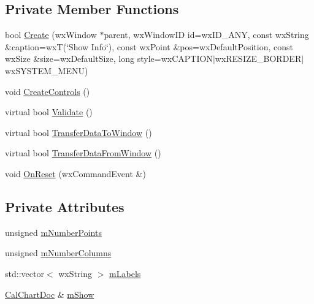 \subsection*{Private Member Functions}
\begin{DoxyCompactItemize}
\item 
bool \hyperlink{a00138_ade3ccb3f32f49eadcb1186a92d1ad6ba}{Create} (wx\-Window $\ast$parent, wx\-Window\-I\-D id=wx\-I\-D\-\_\-\-A\-N\-Y, const wx\-String \&caption=wx\-T(\char`\"{}Show Info\char`\"{}), const wx\-Point \&pos=wx\-Default\-Position, const wx\-Size \&size=wx\-Default\-Size, long style=wx\-C\-A\-P\-T\-I\-O\-N$\vert$wx\-R\-E\-S\-I\-Z\-E\-\_\-\-B\-O\-R\-D\-E\-R$\vert$wx\-S\-Y\-S\-T\-E\-M\-\_\-\-M\-E\-N\-U)
\item 
void \hyperlink{a00138_a1230a2236bf46eea891a46fca6589f6a}{Create\-Controls} ()
\item 
virtual bool \hyperlink{a00138_ac99d821981798d2d133a7003efd0439a}{Validate} ()
\item 
virtual bool \hyperlink{a00138_acb96c055c53e77245a565d6490552392}{Transfer\-Data\-To\-Window} ()
\item 
virtual bool \hyperlink{a00138_a568ef29a06fcce2bc5ac7f3cbcef77eb}{Transfer\-Data\-From\-Window} ()
\item 
void \hyperlink{a00138_acd9723e2d7929bbf189701f35d2246c7}{On\-Reset} (wx\-Command\-Event \&)
\end{DoxyCompactItemize}
\subsection*{Private Attributes}
\begin{DoxyCompactItemize}
\item 
unsigned \hyperlink{a00138_a1f2e5835094435c7f7e3f4ed7b174bdc}{m\-Number\-Points}
\item 
unsigned \hyperlink{a00138_a78df8c808115d12b0c618ee21275f196}{m\-Number\-Columns}
\item 
std\-::vector$<$ wx\-String $>$ \hyperlink{a00138_a2de4d128d3baee474a84997bd07c89ec}{m\-Labels}
\item 
\hyperlink{a00020}{Cal\-Chart\-Doc} \& \hyperlink{a00138_a44069d1b1d7101727e165fc98770faa9}{m\-Show}
\end{DoxyCompactItemize}


